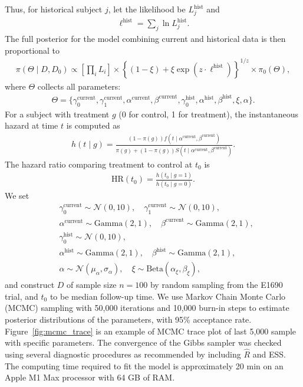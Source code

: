 \documentclass[12pt]{article}
\begin{document}
Thus, for historical subject $j$, let the likelihood be $L^{\text{hist}}_j$ and
\begin{align*}
    \ell^{\text{hist}} = \sum_j \ln L_j^{\text{hist}}.
\end{align*}
The full posterior for the model combining current and historical data is then proportional to
\begin{align*}
    \pi(\Theta \mid D, D_0) \propto \left[\prod_{i}L_i\right] \times \left\{(1 - \xi) + \xi \exp\left(z\cdot \ell^{\text{hist}}\right)\right\}^{1/z}\times \pi_0(\Theta),
\end{align*}
where $\Theta$ collects all parameters:
\begin{align*}
    \Theta = \{\gamma_0^{\text{current}}, \gamma_1^{\text{current}}, \alpha^{\text{current}}, \beta^{\text{current}}, \gamma_0^{\text{hist}}, \alpha^{\text{hist}}, \beta^{\text{hist}}, \xi, \alpha\}.
\end{align*}
For a subject with treatment $g$ (0 for control, 1 for treatment), the instantaneous hazard at time $t$ is computed as
\begin{align*}
    h(t \mid g) = \frac{(1 - \pi(g)) f(t \mid \alpha^{\text{current}}, \beta^{\text{current}})}{\pi(g) + (1 - \pi(g)) S(t \mid \alpha^{\text{current}}, \beta^{\text{current}})}.
\end{align*}
The hazard ratio comparing treatment to control at $t_0$ is
\begin{align*}
    \text{HR}(t_0) = \frac{h(t_0 \mid g = 1)}{h(t_0 \mid g = 0)}.
\end{align*}
We set
\begin{align*}
    & \gamma_0^{\text{current}} \sim \mathcal{N}\left(0, 10 \right),  \quad\gamma_1^{\text{current}} \sim \mathcal{N}\left(0, 10 \right), \\
    & \alpha^{\text{current}} \sim \text{Gamma}(2, 1), \quad  \beta^{\text{current}} \sim \text{Gamma}(2, 1), \\
    & \gamma_0^{\text{hist}} \sim \mathcal{N}\left(0, 10 \right), \\
    & \alpha^{\text{hist}} \sim \text{Gamma}(2, 1), \quad \beta^{\text{hist}} \sim \text{Gamma}(2, 1), \\
    & \alpha \sim \mathcal{N}(\mu_\alpha, \sigma_\alpha), \quad \xi \sim \text{Beta}(\alpha_\xi, \beta_\xi),
\end{align*}
and construct $D$ of sample size $n = 100$ by random sampling from the E1690 trial, and $t_0$ to be median follow-up time.
We use Markov Chain Monte Carlo (MCMC) sampling with 50,000 iterations and 10,000 burn-in steps to estimate posterior distributions of the parameters, with 95\% acceptance rate.
Figure~\ref{fig:mcmc_trace} is an example of MCMC trace plot of last 5,000 sample with specific parameters.
The convergence of the Gibbs
sampler was checked using several diagnostic procedures as recommended by \citet{cowles1996markov} including $\hat{R}$ and ESS.
The computing time required to fit the model is approximately 20 min on an Apple M1 Max processor with 64 GB of RAM.
\end{document}
